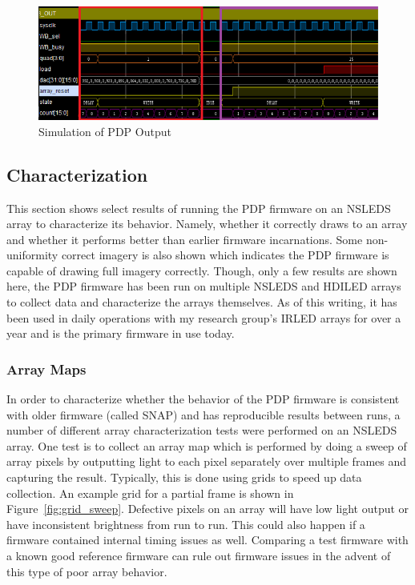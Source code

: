     \begin{figure}
        \centering
        \includegraphics[width=1.0\textwidth]{fig/pdp_output_example.png}
        \caption{Simulation of PDP Output}
        \label{fig:output_example}
    \end{figure}

    \subsection{Characterization}
        This section shows select results of running the PDP firmware on an NSLEDS array to characterize its behavior. Namely, whether it correctly draws to an array and whether it performs better than earlier firmware incarnations. Some non-uniformity correct imagery is also shown which indicates the PDP firmware is capable of drawing full imagery correctly. Though, only a few results are shown here, the PDP firmware has been run on multiple NSLEDS and HDILED arrays to collect data and characterize the arrays themselves. As of this writing, it has been used in daily operations with my research group's IRLED arrays for over a year and is the primary firmware in use today.

        \subsubsection {Array Maps}
            In order to characterize whether the behavior of the PDP firmware is consistent with older firmware (called SNAP) and has reproducible results between runs, a number of different array characterization tests were performed on an NSLEDS array. One test is to collect an array map which is performed by doing a sweep of array pixels by outputting light to each pixel separately over multiple frames and capturing the result. Typically, this is done using grids to speed up data collection. An example grid for a partial frame is shown in Figure~\ref{fig:grid_sweep}. Defective pixels on an array will have low light output or have inconsistent brightness from run to run. This could also happen if a firmware contained internal timing issues as well. Comparing a test firmware with a known good reference firmware can rule out firmware issues in the advent of this type of poor array behavior.

